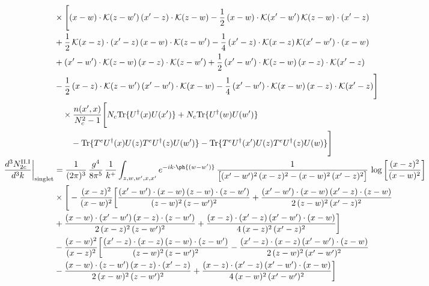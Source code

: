 \begin{align}
&\times\Bigg[(x-w)\cdot\mathcal{K}(z-w^{\prime})\,(x^{\prime}-z)\cdot\mathcal{K}(z-w)-\frac{1}{2}\,(x-w)\cdot\mathcal{K}(x^{\prime}-w^{\prime})\,\mathcal{K}(z-w)\cdot(x^{\prime}-z)\notag \\ & +\frac{1}{2}\,\mathcal{K}(x-z)\cdot(x^{\prime}-z)\,(x-w)\cdot\mathcal{K}(z-w^{\prime}) -\frac{1}{4}\,(x^{\prime}-z)\cdot\mathcal{K}(x-z)\,\mathcal{K}(x^{\prime}-w^{\prime})\cdot(x-w)\notag \\ & +(x^{\prime}-w^{\prime})\cdot\mathcal{K}(z-w)\,(x-z)\cdot\mathcal{K}(z-w^{\prime})+\frac{1}{2}\,(x^{\prime}-w^{\prime})\cdot\mathcal{K}(z-w)\,(x-z)\cdot\mathcal{K}(x^{\prime}-z)\notag \\ & -\frac{1}{2}\,(x-z)\cdot\mathcal{K}(z-w^{\prime})\,(x^{\prime}-w^{\prime})\cdot\mathcal{K}(x-w)-\frac{1}{4}\,(x^{\prime}-w^{\prime})\cdot\mathcal{K}(x-w)\,(x-z)\cdot\mathcal{K}(x^{\prime}-z)\Bigg]\notag\\ &\quad\times\frac{n(x',x)}{N_{c}^{2}-1}\Bigg[N_{c}{\rm Tr}\{U^{\dagger}(x)U(x')\}+N_{c}{\rm Tr}\{U^{\dagger}(w)U(w')\}\notag\\ &\qquad-{\rm Tr}\{T^{e}U^{\dagger}(x)U(z)T^{e}U^{\dagger}(z)U(w')\}-{\rm Tr}\{T^{e}U^{\dagger}(x')U(z)T^{e}U^{\dagger}(z)U(w)\}\Bigg]\\
\frac{d^{3}N^{\rm II.I}_{2c}}{d^{3}k}\bigg|_{\rm singlet} &= \frac{1}{(2\pi)^{3}}\,\frac{g^{4}}{8\pi^{5}}\,\frac{1}{k^{+}}\int_{z,w,w^{\prime},x,x^{\prime}}e^{-ik\cdot\ph{(w-w^{\prime})}}\,\frac{1}{\big[(x^{\prime}-w^{\prime})^{2}\,(x-z)^{2}-(x-w)^{2}\,(x^{\prime}-z)^{2}\big]}\,\log\left[\frac{(x-z)^{2}}{(x-w)^{2}}\right]\notag\\
&\times\Bigg[-\frac{(x-z)^{2}}{(x-w)^{2}}\bigg[\frac{(x^{\prime}-w^{\prime})\cdot(x-w)\,(z-w)\cdot(z-w^{\prime})}{(z-w)^{2}\,(z-w^{\prime})^{2}}+\frac{(x^{\prime}-w^{\prime})\cdot(x-w)\,(x^{\prime}-z)\cdot(z-w)}{2\,(z-w)^{2}\,(x^{\prime}-z)^{2}}\notag \\ & +\frac{(x-w)\cdot(x^{\prime}-w^{\prime})\,(x-z)\cdot(z-w^{\prime})}{2\,(x-z)^{2}\,(z-w^{\prime})^{2}}+\frac{(x-z)\cdot(x^{\prime}-z)\,(x^{\prime}-w^{\prime})\cdot(x-w)}{4\,(x-z)^{2}\,(x^{\prime}-z)^{2}}\bigg]\notag\\
&-\frac{(x-w)^{2}}{(x-z)^{2}}\bigg[\frac{(x^{\prime}-z)\cdot(x-z)\,(z-w)\cdot(z-w^{\prime})}{(z-w)^{2}\,(z-w^{\prime})^{2}}-\frac{(x^{\prime}-z)\cdot(x-z)\,(x^{\prime}-w^{\prime})\cdot(z-w)}{2\,(z-w)^{2}\,(x^{\prime}-w^{\prime})^{2}}\notag \\ & -\frac{(x-w)\cdot(z-w^{\prime})\,(x-z)\cdot(x^{\prime}-z)}{2\,(x-w)^{2}\,(z-w^{\prime})^{2}}+\frac{(x-z)\cdot(x^{\prime}-z)\,(x^{\prime}-w^{\prime})\cdot(x-w)}{4\,(x-w)^{2}\,(x^{\prime}-w^{\prime})^{2}}\bigg]\notag\\

\end{align}
